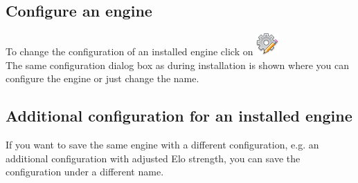 \documentclass[11pt,a4paper]{article}
\begin{document}
\subsection{Configure an engine}

To change the configuration of an installed engine click on \includegraphics[scale=0.5]{cog_edit.png}\\
The same configuration dialog box as during installation is shown where you can configure the engine or just change the name.

\subsection{Additional configuration for an installed engine}

If you want to save the same engine with a different configuration, e.g. an additional configuration with adjusted Elo strength, you can save the configuration under a different name.
\end{document}
